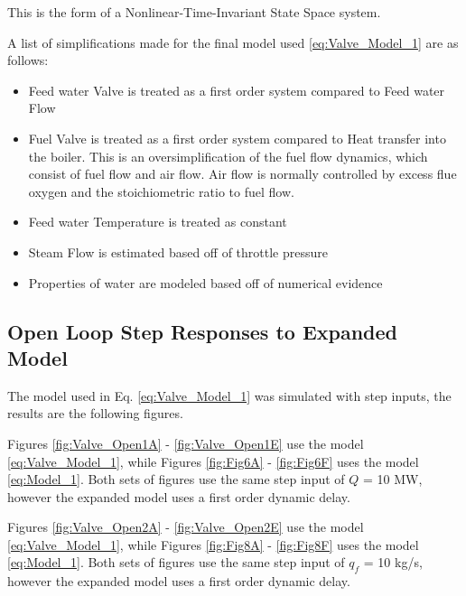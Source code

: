         This is the form of a Nonlinear-Time-Invariant State Space system. 
        
        A list of simplifications made for the final model used \eqref{eq:Valve_Model_1} are as follows:
    
        \begin{itemize}
          \item Feed water Valve is treated as a first order system compared to Feed water Flow
          \item Fuel Valve is treated as a first order system compared to Heat transfer into the boiler. This is an oversimplification of the fuel flow dynamics, which consist of fuel flow and air flow. Air flow is normally controlled by excess flue oxygen and the stoichiometric ratio to fuel flow.  
          \item Feed water Temperature is treated as constant
          \item Steam Flow is estimated based off of throttle pressure
          \item Properties of water are modeled based off of numerical evidence
        \end{itemize}        
    
    \subsection{Open Loop Step Responses to Expanded Model}
    
        The model used in Eq. \ref{eq:Valve_Model_1} was simulated with step inputs, the results are the following figures. 
        
        Figures \ref{fig:Valve_Open1A} - \ref{fig:Valve_Open1E} use the model \eqref{eq:Valve_Model_1}, while Figures \ref{fig:Fig6A} - \ref{fig:Fig6F} uses the model \eqref{eq:Model_1}. Both sets of figures use the same step input of $Q$ = 10 MW, however the expanded model uses a first order dynamic delay. 
        
        Figures \ref{fig:Valve_Open2A} - \ref{fig:Valve_Open2E} use the model \eqref{eq:Valve_Model_1}, while Figures \ref{fig:Fig8A} - \ref{fig:Fig8F} uses the model \eqref{eq:Model_1}. Both sets of figures use the same step input of $q_f$ = 10 kg/s, however the expanded model uses a first order dynamic delay. 
        
